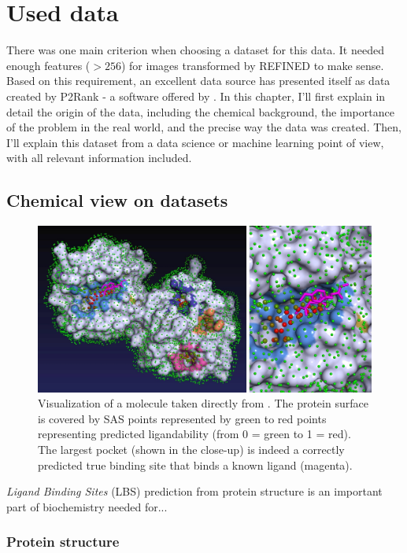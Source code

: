 \chapter{Used data}

There was one main criterion when choosing a dataset for this data. It needed enough features ($> 256$) for images transformed by REFINED to make sense. Based on this requirement, an excellent data source has presented itself as data created by P2Rank - a software offered by \cite{P2RANK}. In this chapter, I'll first explain in detail the origin of the data, including the chemical background, the importance of the problem in the real world, and the precise way the data was created. Then, I'll explain this dataset from a data science or machine learning point of view, with all relevant information included. 

\section{Chemical view on datasets}
\begin{figure}
    \centering
    \includegraphics[width=1\linewidth]{p2rank.jpg}
    \caption{Visualization of a molecule taken directly from \cite{P2RANK}. The protein surface is covered by SAS points represented by green to red points representing predicted ligandability  (from 0 = green to 1 = red). The largest pocket (shown in the close-up) is indeed a correctly predicted true binding site that binds a known ligand (magenta). }
    \label{fig:p2rank_visualization}
\end{figure}
\textit{Ligand Binding Sites} (LBS) prediction from protein structure is an important part of biochemistry needed for...

\subsection{Protein structure}

